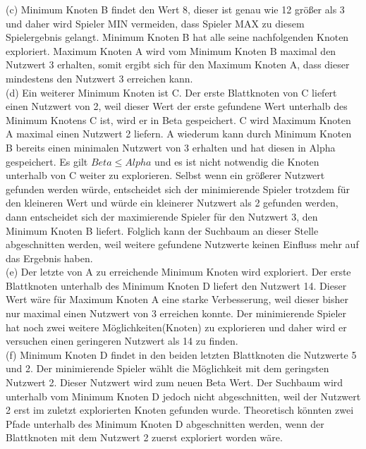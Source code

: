 (c) Minimum Knoten B findet den Wert 8, dieser ist genau wie 12 größer als 3 und daher wird Spieler MIN vermeiden, dass Spieler MAX zu diesem Spielergebnis gelangt. Minimum Knoten B hat alle seine nachfolgenden Knoten exploriert. Maximum Knoten A wird vom Minimum Knoten B maximal den Nutzwert 3 erhalten, somit ergibt sich für den Maximum Knoten A, dass dieser mindestens den Nutzwert 3 erreichen kann. \\

(d) Ein weiterer Minimum Knoten ist C. Der erste Blattknoten von C liefert einen Nutzwert von 2, weil dieser Wert der erste gefundene Wert unterhalb des Minimum Knotens C ist, wird er in Beta gespeichert. C wird Maximum Knoten A maximal einen Nutzwert 2 liefern. A wiederum kann durch Minimum Knoten B bereits einen minimalen Nutzwert von 3 erhalten und hat diesen in Alpha gespeichert. Es gilt $Beta \leq Alpha$ und es ist nicht notwendig die Knoten unterhalb von C weiter zu explorieren. Selbst wenn ein größerer Nutzwert gefunden werden würde, entscheidet sich der minimierende Spieler trotzdem für den kleineren Wert und würde ein kleinerer Nutzwert als 2 gefunden werden, dann entscheidet sich der maximierende Spieler für den Nutzwert 3, den Minimum Knoten B liefert. Folglich kann der Suchbaum an dieser Stelle abgeschnitten werden, weil weitere gefundene Nutzwerte keinen Einfluss mehr auf das Ergebnis haben. \\

(e) Der letzte von A zu erreichende Minimum Knoten wird exploriert. Der erste Blattknoten unterhalb des Minimum Knoten D liefert den Nutzwert 14. Dieser Wert wäre für Maximum Knoten A eine starke Verbesserung, weil dieser bisher nur maximal einen Nutzwert von 3 erreichen konnte. Der minimierende Spieler hat noch zwei weitere Möglichkeiten(Knoten) zu explorieren und daher wird er versuchen einen geringeren Nutzwert als 14 zu finden. \\

(f) Minimum Knoten D findet in den beiden letzten Blattknoten die Nutzwerte 5 und 2. Der minimierende Spieler wählt die Möglichkeit mit dem geringsten Nutzwert 2. Dieser Nutzwert wird zum neuen Beta Wert. Der Suchbaum wird unterhalb vom Minimum Knoten D jedoch nicht abgeschnitten, weil der Nutzwert 2 erst im zuletzt explorierten Knoten gefunden wurde. Theoretisch könnten zwei Pfade unterhalb des Minimum Knoten D abgeschnitten werden, wenn der Blattknoten mit dem Nutzwert 2 zuerst exploriert worden wäre.

